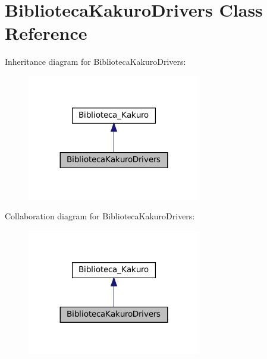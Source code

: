 \section{Biblioteca\+Kakuro\+Drivers Class Reference}
\label{class_dominio_1_1controladores_1_1_drivers_1_1_biblioteca_kakuro_drivers}


Inheritance diagram for Biblioteca\+Kakuro\+Drivers\+:
\nopagebreak
\begin{figure}[H]
\begin{center}
\leavevmode
\includegraphics[width=215pt]{class_dominio_1_1controladores_1_1_drivers_1_1_biblioteca_kakuro_drivers__inherit__graph}
\end{center}
\end{figure}


Collaboration diagram for Biblioteca\+Kakuro\+Drivers\+:
\nopagebreak
\begin{figure}[H]
\begin{center}
\leavevmode
\includegraphics[width=215pt]{class_dominio_1_1controladores_1_1_drivers_1_1_biblioteca_kakuro_drivers__coll__graph}
\end{center}
\end{figure}

